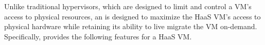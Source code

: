 %
%
%

Unlike traditional hypervisors, which are designed to limit and control a VM's 
access to physical resources, an \na is designed to maximize the HaaS VM's 
access to physical hardware while retaining its ability to live migrate the VM on-demand.
Specifically, \na provides the following features for a HaaS VM. 

